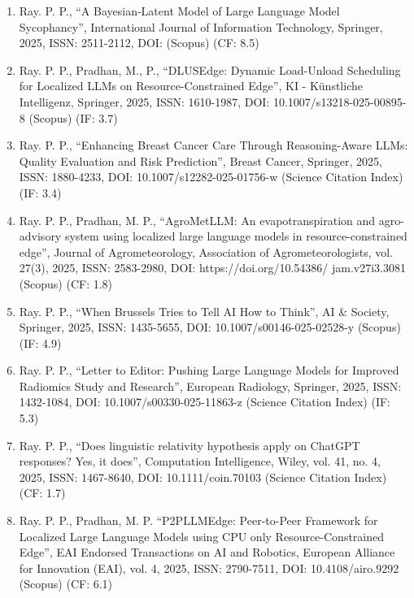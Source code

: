\documentclass[11pt,a4paper]{moderncv}
\begin{document}
\begin{adjustwidth}{6em}{0pt}
	\begin{enumerate}
		
		
		\item Ray. P. P., “A Bayesian‐Latent Model of Large Language Model Sycophancy”, International Journal of Information Technology, Springer, 2025, ISSN: 2511-2112, DOI: (Scopus) (CF: 8.5)
		
		\item Ray. P. P., Pradhan, M., P., “DLUSEdge: Dynamic Load-Unload Scheduling for Localized LLMs on Resource-Constrained Edge”, KI - Künstliche Intelligenz, Springer, 2025, ISSN: 1610-1987, DOI: 10.1007/s13218-025-00895-8 (Scopus) (IF: 3.7) 
	
		\item Ray. P. P., “Enhancing Breast Cancer Care Through Reasoning-Aware LLMs: Quality Evaluation and Risk Prediction”, Breast Cancer, Springer, 2025, ISSN: 1880-4233, DOI: 10.1007/s12282-025-01756-w (Science Citation Index) (IF: 3.4) 
		
				
		\item Ray. P. P., Pradhan, M. P., “AgroMetLLM: An evapotranspiration and agro-advisory system using localized large language models in resource-constrained edge”, Journal of Agrometeorology, Association of Agrometeorologists, vol. 27(3), 2025, ISSN: 2583-2980, DOI: https://doi.org/10.54386/ jam.v27i3.3081 (Scopus) (CF: 1.8)
		
		\item Ray. P. P., “When Brussels Tries to Tell AI How to Think”, AI \& Society, Springer, 2025, ISSN: 1435-5655, DOI: 10.1007/s00146-025-02528-y (Scopus) (IF: 4.9) 
		
		\item Ray. P. P., “Letter to Editor: Pushing Large Language Models for Improved Radiomics Study and Research”, European Radiology, Springer, 2025, ISSN: 1432-1084, DOI: 10.1007/s00330-025-11863-z (Science Citation Index) (IF: 5.3)
		
		\item Ray. P. P., “Does linguistic relativity hypothesis apply on ChatGPT responses? Yes, it does”, Computation Intelligence, Wiley, vol. 41, no. 4, 2025, ISSN: 1467-8640, DOI: 10.1111/coin.70103 (Science Citation Index) (CF: 1.7)
		
		\item Ray. P. P., Pradhan, M. P. “P2PLLMEdge: Peer-to-Peer Framework for Localized Large Language Models using CPU only Resource-Constrained Edge”, EAI Endorsed Transactions on AI and Robotics, European Alliance for Innovation (EAI), vol. 4, 2025, ISSN: 2790-7511, DOI: 10.4108/airo.9292 (Scopus) (CF: 6.1)
		

\end{enumerate}
\end{adjustwidth}
\end{document}
